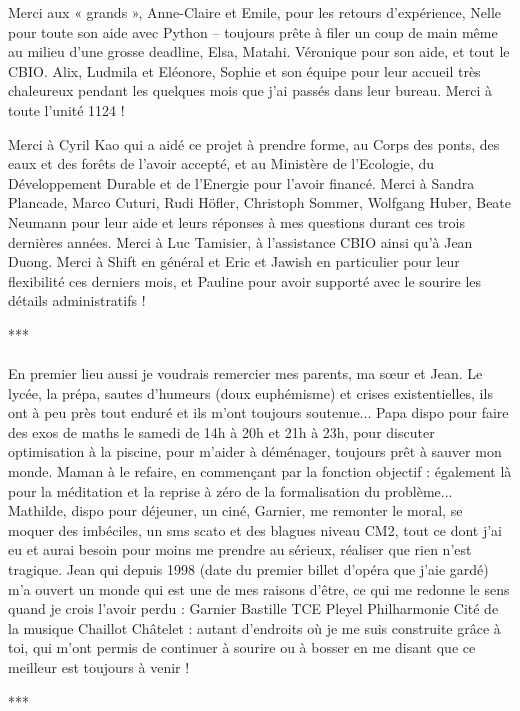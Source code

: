 \documentclass[11pt, oneside]{Thesis} %
\begin{document}
{Merci aux « grands », Anne-Claire et Emile, pour les retours d'expérience, Nelle pour toute son aide avec Python – toujours prête à filer un coup de main même au milieu d'une grosse deadline, Elsa, Matahi. Véronique pour son aide, et tout le CBIO. Alix, Ludmila et Eléonore, Sophie et son équipe pour leur accueil très chaleureux pendant les quelques mois que j'ai passés dans leur bureau. Merci à toute l'unité 1124 !

Merci à Cyril Kao qui a aidé ce projet à prendre forme, au Corps des ponts, des eaux et des forêts de l'avoir accepté, et au Ministère de l'Ecologie, du Développement Durable et de l'Energie pour l'avoir financé. Merci à Sandra Plancade, Marco Cuturi, Rudi Höfler, Christoph Sommer, Wolfgang Huber, Beate Neumann pour leur aide et leurs réponses à mes questions durant ces trois dernières années. Merci à Luc Tamisier, à l'assistance CBIO ainsi qu'à Jean Duong. Merci à Shift en général et Eric et Jawish en particulier pour leur flexibilité ces derniers mois, et Pauline pour avoir supporté avec le sourire les détails administratifs !
\begin{center}
***
\end{center}
\paragraph{}
En premier lieu aussi je voudrais remercier mes parents, ma sœur et Jean. Le lycée, la prépa, sautes d'humeurs (doux euphémisme) et crises existentielles, ils ont à peu près tout enduré et ils m'ont toujours soutenue... Papa dispo pour faire des exos de maths le samedi de 14h à 20h et 21h à 23h, pour discuter optimisation à la piscine, pour m'aider à déménager, toujours prêt à sauver mon monde. Maman à le refaire, en commençant par la fonction objectif : également là pour la méditation et la reprise à zéro de la formalisation du problème... Mathilde, dispo pour déjeuner, un ciné, Garnier, me remonter le moral, se moquer des imbéciles, un sms scato et des blagues niveau CM2, tout ce dont j'ai eu et aurai besoin pour moins me prendre au sérieux, réaliser que rien n'est tragique. Jean qui depuis 1998 (date du premier billet d'opéra que j'aie gardé) m'a ouvert un monde qui est une de mes raisons d'être, ce qui me redonne le sens quand je crois l'avoir perdu : Garnier Bastille TCE Pleyel Philharmonie Cité de la musique Chaillot Châtelet : autant d'endroits où je me suis construite grâce à toi, qui m'ont permis de continuer à sourire ou à bosser en me disant que ce meilleur est toujours à venir !
\begin{center}
***
\end{center}
}
\end{document}
